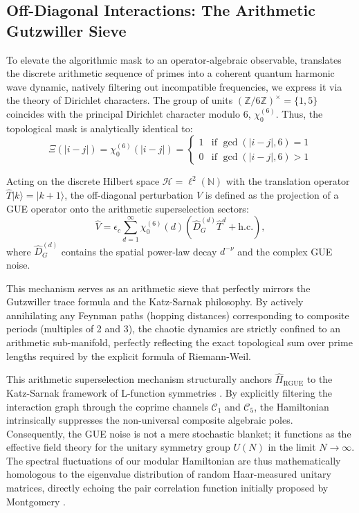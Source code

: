 \documentclass[aps,prl,preprint,superscriptaddress,floatfix]{revtex4-2}
\newcommand{\N}{\mathbb{N}}
\newcommand{\Hilb}{\mathcal{H}}
\newcommand{\Zmod}{\mathbb{Z}/6\mathbb{Z}}
\begin{document}
\subsection{Off-Diagonal Interactions: The Arithmetic Gutzwiller Sieve}

To elevate the algorithmic mask to an operator-algebraic observable, translates the discrete arithmetic sequence of primes into a coherent quantum harmonic wave dynamic, natively filtering out incompatible frequencies, we express it via the theory of Dirichlet characters. The group of units $(\Zmod)^\times = \{1, 5\}$ coincides with the principal Dirichlet character modulo 6, $\chi_0^{(6)}$. Thus, the topological mask is analytically identical to:
\begin{equation}
\Xi(|i-j|) = \chi_0^{(6)}(|i-j|) = \begin{cases} 
1 & \text{if } \gcd(|i-j|, 6) = 1 \\ 
0 & \text{if } \gcd(|i-j|, 6) > 1 
\end{cases}
\end{equation}

Acting on the discrete Hilbert space $\Hilb = \ell^2(\N)$ with the translation operator $\hat{T}|k\rangle = |k+1\rangle$, the off-diagonal perturbation $\hat{V}$ is defined as the projection of a GUE operator onto the arithmetic superselection sectors:
\begin{equation}
\label{eq:interaction}
\hat{V} = \epsilon_c \sum_{d=1}^{\infty} \chi_0^{(6)}(d) \left( \hat{D}_G^{(d)} \hat{T}^d + \text{h.c.} \right),
\end{equation}
where $\hat{D}_G^{(d)}$ contains the spatial power-law decay $d^{-\nu}$ and the complex GUE noise. 

This mechanism serves as an arithmetic sieve that perfectly mirrors the Gutzwiller trace formula and the Katz-Sarnak philosophy. By actively annihilating any Feynman paths (hopping distances) corresponding to composite periods (multiples of 2 and 3), the chaotic dynamics are strictly confined to an arithmetic sub-manifold, perfectly reflecting the exact topological sum over prime lengths required by the explicit formula of Riemann-Weil.

This arithmetic superselection mechanism structurally anchors $\hat{H}_{\text{RGUE}}$ to the Katz-Sarnak framework of L-function symmetries \cite{KatzSarnak1999}. By explicitly filtering the interaction graph through the coprime channels $\mathcal{C}_1$ and $\mathcal{C}_5$, the Hamiltonian intrinsically suppresses the non-universal composite algebraic poles. Consequently, the GUE noise is not a mere stochastic blanket; it functions as the effective field theory for the unitary symmetry group $U(N)$ in the limit $N \to \infty$. The spectral fluctuations of our modular Hamiltonian are thus mathematically homologous to the eigenvalue distribution of random Haar-measured unitary matrices, directly echoing the pair correlation function initially proposed by Montgomery \cite{Montgomery1973}.
\end{document}
